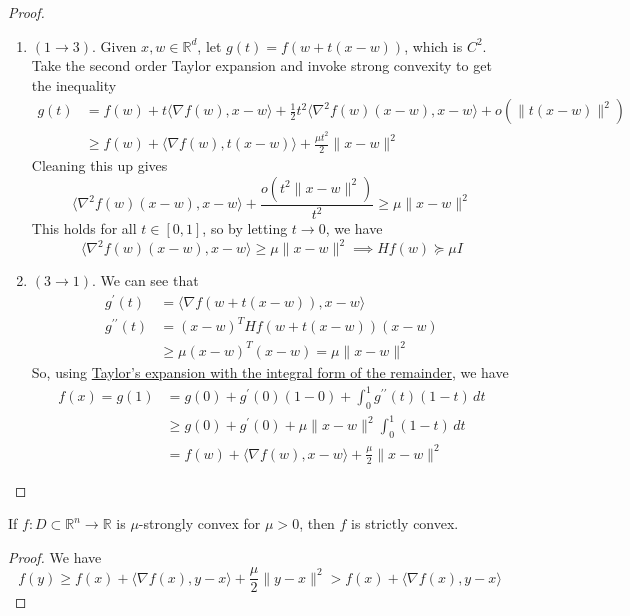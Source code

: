 \begin{proof}
\begin{enumerate}
		  \item $(1 \rightarrow 3)$. Given $x, w \in \mathbb{R}^d$, let $g(t) = f(w + t(x - w))$, which is $C^2$. Take the second order Taylor expansion and invoke strong convexity to get the inequality 
				\begin{align}
					g(t) & = f(w) + t \langle \nabla f(w), x - w \rangle + \frac{1}{2} t^2 \langle \nabla^2 f(w) (x - w), x - w \rangle + o(\|t(x - w)\|^2) \\ 
							 & \geq f(w) + \langle \nabla f(w), t (x - w) \rangle + \frac{\mu t^2}{2} \|x - w\|^2
				\end{align}
				Cleaning this up gives 
				\begin{equation}
					\langle \nabla^2 f(w) (x - w), x - w \rangle + \frac{o(t^2 \|x - w\|^2)}{t^2} \geq \mu \|x - w\|^2
				\end{equation}
				This holds for all $t \in [0, 1]$, so by letting $t \to 0$, we have 
				\begin{equation}
				  \langle \nabla^2 f(w) (x - w), x - w \rangle \geq \mu \|x - w\|^2 \implies Hf(w) \succeq \mu I
				\end{equation}

		  \item $(3 \rightarrow 1)$. We can see that 
				\begin{align}
					g^\prime (t) & = \langle \nabla f(w + t(x - w)), x - w \rangle \\ 
					g^{\prime\prime} (t) & = (x - w)^T H f(w + t(x - w)) (x - w) \\ 
															 & \geq \mu (x - w)^T (x - w) = \mu \|x - w\|^2
				\end{align}
				So, using \hyperref[real-thm:integral_form_remainder]{Taylor's expansion with the integral form of the remainder}, we have 
				\begin{align}
					f(x) = g(1) & = g(0) + g^\prime (0) (1 - 0) + \int_0^1 g^{\prime\prime} (t) (1 - t) \,dt \\ 
											& \geq g(0) + g^\prime (0) + \mu \|x - w\|^2 \int_0^1 (1 - t) \,dt \\ 
											& = f(w) + \langle \nabla f(w), x - w \rangle + \frac{\mu}{2} \|x - w\|^2
				\end{align}
		\end{enumerate}
	\end{proof}

	\begin{lemma}
		If $f: D \subset \mathbb{R}^n \to \mathbb{R}$ is $\mu$-strongly convex for $\mu > 0$, then $f$ is strictly convex. 
	\end{lemma}
	\begin{proof}
	  We have 
		\begin{equation}
			f(y) \geq f(x) + \langle \nabla f(x), y - x \rangle + \frac{\mu}{2} \| y - x\|^2 > f(x) + \langle \nabla f(x), y - x \rangle
		\end{equation}
	\end{proof}

